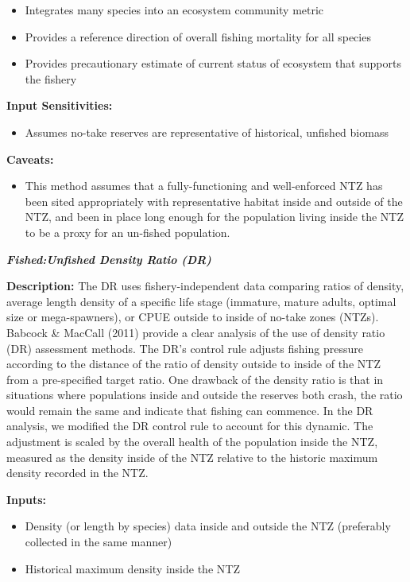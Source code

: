 \documentclass[]{book}
\providecommand{\tightlist}{%
  \setlength{\itemsep}{0pt}\setlength{\parskip}{0pt}}
\begin{document}
\begin{itemize}
\item
  Integrates many species into an ecosystem community metric
\item
  Provides a reference direction of overall fishing mortality for all
  species
\item
  Provides precautionary estimate of current status of ecosystem that
  supports the fishery
\end{itemize}

\textbf{Input Sensitivities:}

\begin{itemize}
\tightlist
\item
  Assumes no-take reserves are representative of historical, unfished
  biomass
\end{itemize}

\textbf{Caveats:}

\begin{itemize}
\tightlist
\item
  This method assumes that a fully-functioning and well-enforced NTZ has
  been sited appropriately with representative habitat inside and
  outside of the NTZ, and been in place long enough for the population
  living inside the NTZ to be a proxy for an un-fished population.
\end{itemize}

\textbf{\emph{Fished:Unfished Density Ratio (DR)}}

\textbf{Description:} The DR uses fishery-independent data comparing
ratios of density, average length density of a specific life stage
(immature, mature adults, optimal size or mega-spawners), or CPUE
outside to inside of no-take zones (NTZs). Babcock \& MacCall (2011)
provide a clear analysis of the use of density ratio (DR) assessment
methods. The DR's control rule adjusts fishing pressure according to the
distance of the ratio of density outside to inside of the NTZ from a
pre-specified target ratio. One drawback of the density ratio is that in
situations where populations inside and outside the reserves both crash,
the ratio would remain the same and indicate that fishing can commence.
In the DR analysis, we modified the DR control rule to account for this
dynamic. The adjustment is scaled by the overall health of the
population inside the NTZ, measured as the density inside of the NTZ
relative to the historic maximum density recorded in the NTZ.

\textbf{Inputs: }

\begin{itemize}
\item
  Density (or length by species) data inside and outside the NTZ
  (preferably collected in the same manner)
\item
  Historical maximum density inside the NTZ
\end{itemize}
\end{document}
